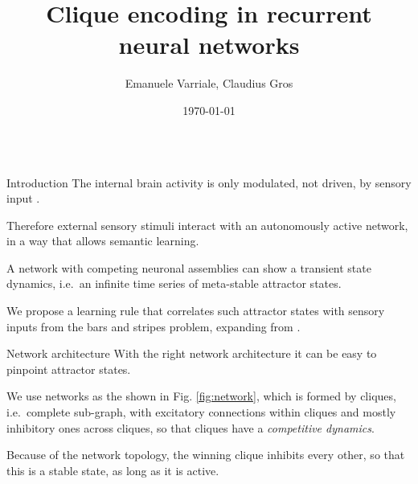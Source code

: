 \documentclass[final,hyperref={pdfpagelabels=false}]{beamer}
\title{Clique encoding in recurrent neural networks} %
\author[varriale@itp.uni-frankfurt.de]{Emanuele Varriale, Claudius Gros}
\institute{Institute for Theoretical Physics, Goethe University, Frankfurt am Main, Germany}
\date{\today}
\begin{document}
\begin{frame}
	
	\begin{columns}
		
		\hfill
		\begin{column}{.30\textwidth}
				\begin{minipage}[T]{.95\textwidth}	%
					\parbox[t][\columnheight]{\textwidth}{

						\begin{block}{Introduction}
							The internal brain activity is only modulated, not driven, by sensory input \cite{fiser2004modulation}. 
							
							Therefore external sensory stimuli interact with an autonomously active network, in a way that allows semantic learning.
							
							A network with competing neuronal assemblies can show a transient state dynamics, i.e.\ an infinite time series of meta-stable attractor states.
							
							We propose a learning rule that correlates such attractor states with sensory inputs from the bars and stripes problem, expanding from \cite{gros2017semantic}.
						\end{block}
						
						\vfill
						\begin{block}{Network architecture}
							With the right network architecture it can be easy to pinpoint attractor states. 
							
							We use networks as the shown in Fig. \ref{fig:network}, which is formed by cliques, i.e.\ complete sub-graph, with excitatory connections within cliques and mostly inhibitory ones across cliques, so that cliques have a \emph{competitive dynamics}. 
							
							Because of the network topology, the winning clique inhibits every other, so that this is a stable state, as long as it is active.
							

\end{block}}
\end{minipage}
\end{column}
\end{columns}
\end{frame}
\end{document}

